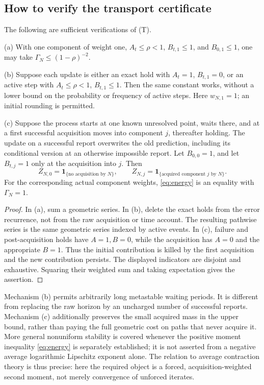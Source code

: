 \subsection{How to verify the transport certificate}
\begin{proposition}\label{prop:mechanisms}
The following are sufficient verifications of \textup{(T)}.

\textup{(a)} With one component of weight one, $A_t\le\rho<1$, $B_{t,1}\le1$, and $B_{0,1}\le1$, one may take $\Gamma_N\le(1-\rho)^{-2}$.

\textup{(b)} Suppose each update is either an exact hold with $A_t=1$, $B_{t,1}=0$, or an active step with $A_t\le\rho<1$, $B_{t,1}\le1$. Then the same constant works, without a lower bound on the probability or frequency of active steps. Here $w_{N,1}=1$; an initial rounding is permitted.

\textup{(c)} Suppose the process starts at one known unresolved point, waits there, and at a first successful acquisition moves into component $j$, thereafter holding. The update on a successful report overwrites the old prediction, including its conditional version at an otherwise impossible report. Let $B_{0,0}=1$, and let $B_{t,j}=1$ only at the acquisition into $j$. Then
\[
 Z_{N,0}=\mathbf1_{\{\text{no acquisition by }N\}},\qquad
 Z_{N,j}=\mathbf1_{\{\text{acquired component }j\text{ by }N\}}.
\]
For the corresponding actual component weights, \eqref{eq:energy} is an equality with $\Gamma_N=1$.
\end{proposition}
\begin{proof}
In (a), sum a geometric series. In (b), delete the exact holds from the error recurrence, not from the raw acquisition or time account. The resulting pathwise series is the same geometric series indexed by active events. In (c), failure and post-acquisition holds have $A=1,B=0$, while the acquisition has $A=0$ and the appropriate $B=1$. Thus the initial contribution is killed by the first acquisition and the new contribution persists. The displayed indicators are disjoint and exhaustive. Squaring their weighted sum and taking expectation gives the assertion.
\end{proof}

Mechanism (b) permits arbitrarily long metastable waiting periods. It is different from replacing the raw horizon by an uncharged number of successful reports. Mechanism (c) additionally preserves the small acquired mass in the upper bound, rather than paying the full geometric cost on paths that never acquire it. More general nonuniform stability is covered whenever the positive moment inequality \eqref{eq:energy} is separately established; it is not asserted from a negative average logarithmic Lipschitz exponent alone. The relation to average contraction theory \cite{diaconis} is thus precise: here the required object is a forced, acquisition-weighted second moment, not merely convergence of unforced iterates.

